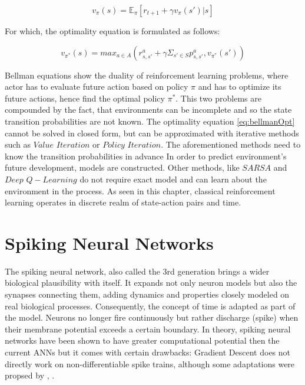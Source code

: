 \begin{equation}
	v_{\pi}(s) = \mathbb{E}_{\pi}[r_{t+1} + \gamma v_{\pi}(s') | s]
\end{equation}\label{eq:bellman}


For which, the optimality equation is formulated as follows:


\begin{equation}
	v_{\pi^*}(s) = max_{a \in A}(r_{s, s'}^a + \gamma \Sigma_{s' \in S} p_{s,s'}^a, v_{\pi^*}(s'))
\end{equation}\label{eq:bellmanOpt}

Bellman equations show the duality of reinforcement learning problems, where actor has to evaluate future action based on policy \(\pi\) and has to optimize its future actions, hence find the optimal policy \(\pi^*\). This two problems are compounded by the fact, that environments can be incomplete and so the state transition probabilities are not known. The optimality equation \eqref{eq:bellmanOpt} cannot be solved in closed form, but can be approximated with iterative methods such as \(Value\) \(Iteration\) or \(Policy\) \(Iteration\). The aforementioned methods need to know the transition probabilities in advance In order to predict environment's future development, models are constructed. Other methods, like \(SARSA\) and \(Deep\) \(Q-Learning\) do not require exact model and can learn about the environment in the process. As seen in this chapter, classical reinforcement learning operates in discrete realm of state-action pairs and time.

\section{Spiking Neural Networks}

The spiking neural network, also called the 3rd generation brings a wider biological plausibility with itself. It expands not only neuron models but also the synapses connecting them, adding dynamics and properties closely modeled on real biological processes. Consequently, the concept of time is adapted as part of the model. Neurons no longer fire continuously but rather discharge (spike) when their membrane potential exceeds a certain boundary. In theory, spiking neural networks have been shown to have greater computational potential then the current ANNs but it comes with certain drawbacks: Gradient Descent does not directly work on non-differentiable spike trains, although some adaptations were propsed by \cite{18}, \cite{19}.

